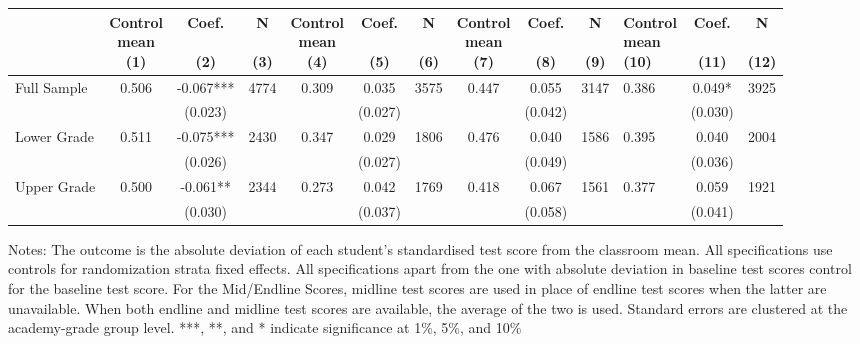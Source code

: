 \begin{table}[!h]
\begin{threeparttable}
\begin{tabular}[t]{lccccccccclcc}
  & \makecell{Control \\ mean \\ (1)} & \makecell{Coef. \\  \\ (2)} & \makecell{N \\ \\ (3)} & \makecell{Control \\ mean \\ (4)} & \makecell{Coef. \\ \\ (5)} & \makecell{N \\ \\ (6)} & \makecell{Control \\ mean \\ (7)} & \makecell{Coef. \\ \\ (8)} & \makecell{N \\ \\ (9)} & \makecell{Control \\ mean \\ (10)} & \makecell{Coef. \\ \\ (11)} & \makecell{N \\ \\ (12)}\\
\midrule
Full Sample & 0.506 & -0.067*** & 4774 & 0.309 & 0.035 & 3575 & 0.447 & 0.055 & 3147 & 0.386 & 0.049* & 3925\\
 &  & (0.023) &  &  & (0.027) &  &  & (0.042) &  &  & (0.030) & \\
Lower Grade & 0.511 & -0.075*** & 2430 & 0.347 & 0.029 & 1806 & 0.476 & 0.040 & 1586 & 0.395 & 0.040 & 2004\\
 &  & (0.026) &  &  & (0.027) &  &  & (0.049) &  &  & (0.036) & \\
Upper Grade & 0.500 & -0.061** & 2344 & 0.273 & 0.042 & 1769 & 0.418 & 0.067 & 1561 & 0.377 & 0.059 & 1921\\
 &  & (0.030) &  &  & (0.037) &  &  & (0.058) &  &  & (0.041) & \\
\hline
\bottomrule
\end{tabular}
\begin{tablenotes}[para]
\item Notes: The outcome is the absolute deviation of each student's standardised test score from the classroom mean. All specifications use controls for randomization strata fixed effects. All specifications apart from the one with absolute deviation in baseline test scores control for the baseline test score. For the Mid/Endline Scores, midline test scores are used in place of endline test scores when the latter are unavailable. When both endline and midline test scores are available, the average of the two is used. Standard errors are clustered at the academy-grade group level. ***, **, and * indicate significance at 1\%, 5\%, and 10\%
\end{tablenotes}
\end{threeparttable}
\end{table}

